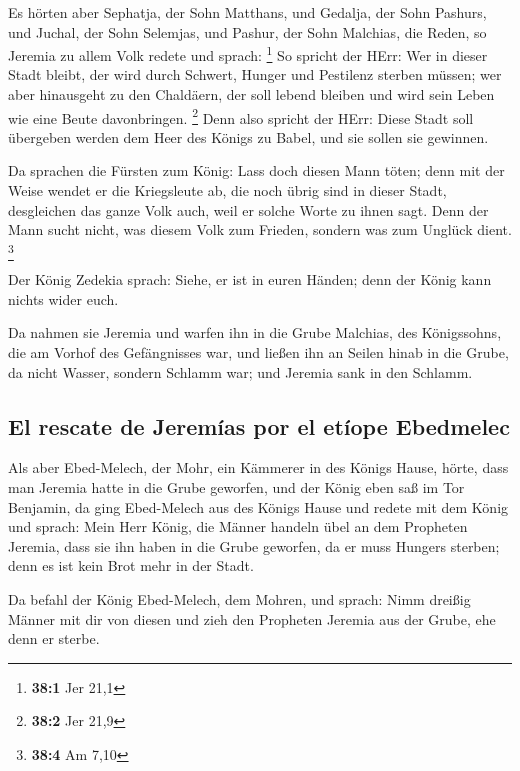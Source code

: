 Es hörten aber Sephatja, der Sohn Matthans, und Gedalja,
der Sohn Pashurs, und Juchal, der Sohn Selemjas, und Pashur, der Sohn
Malchias, die Reden, so Jeremia zu allem Volk redete und sprach:
\footnote{\textbf{38:1} Jer 21,1}  So spricht der HErr:
Wer in dieser Stadt bleibt, der wird durch Schwert, Hunger und Pestilenz
sterben müssen; wer aber hinausgeht zu den Chaldäern, der soll lebend
bleiben und wird sein Leben wie eine Beute davonbringen. \footnote{\textbf{38:2}
  Jer 21,9}  Denn also spricht der HErr: Diese Stadt soll
übergeben werden dem Heer des Königs zu Babel, und sie sollen sie
gewinnen.

 Da sprachen die Fürsten zum König: Lass doch diesen Mann
töten; denn mit der Weise wendet er die Kriegsleute ab, die noch übrig
sind in dieser Stadt, desgleichen das ganze Volk auch, weil er solche
Worte zu ihnen sagt. Denn der Mann sucht nicht, was diesem Volk zum
Frieden, sondern was zum Unglück dient. \footnote{\textbf{38:4} Am 7,10}

 Der König Zedekia sprach: Siehe, er ist in euren Händen;
denn der König kann nichts wider euch.

 Da nahmen sie Jeremia und warfen ihn in die Grube
Malchias, des Königssohns, die am Vorhof des Gefängnisses war, und
ließen ihn an Seilen hinab in die Grube, da nicht Wasser, sondern
Schlamm war; und Jeremia sank in den Schlamm.

\hypertarget{el-rescate-de-jeremuxedas-por-el-etuxedope-ebedmelec}{%
\subsection{El rescate de Jeremías por el etíope
Ebedmelec}\label{el-rescate-de-jeremuxedas-por-el-etuxedope-ebedmelec}}

 Als aber Ebed-Melech, der Mohr, ein Kämmerer in des
Königs Hause, hörte, dass man Jeremia hatte in die Grube geworfen, und
der König eben saß im Tor Benjamin,  da ging Ebed-Melech
aus des Königs Hause und redete mit dem König und sprach: 
Mein Herr König, die Männer handeln übel an dem Propheten Jeremia, dass
sie ihn haben in die Grube geworfen, da er muss Hungers sterben; denn es
ist kein Brot mehr in der Stadt.

 Da befahl der König Ebed-Melech, dem Mohren, und sprach:
Nimm dreißig Männer mit dir von diesen und zieh den Propheten Jeremia
aus der Grube, ehe denn er sterbe.

